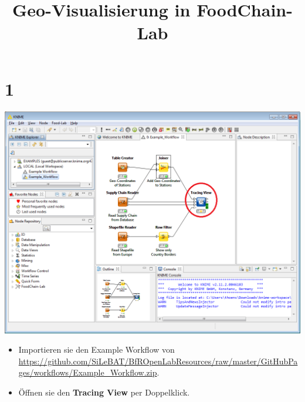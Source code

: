 \documentclass{beamer}
\title{Geo-Visualisierung in FoodChain-Lab}
\date{}
\begin{document}
\maketitle
 
\section{1}
\begin{frame}
	\begin{center}
  		\includegraphics[height=0.6\textheight]{1.png}
	\end{center}
	\begin{itemize}
		\item Importieren sie den Example Workflow von \url{https://github.com/SiLeBAT/BfROpenLabResources/raw/master/GitHubPages/workflows/Example_Workflow.zip}.
		\item Öffnen sie den \textbf{Tracing View} per Doppelklick.
	\end{itemize}
\end{frame}
\end{document}

